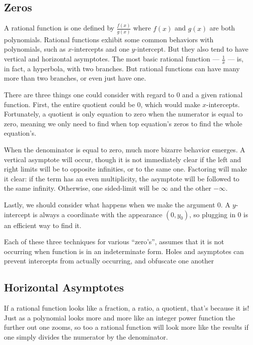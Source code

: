 
\subsection{Zeros}



A rational function is one defined by $\frac{f(x)}{g(x)}$ where $f(x)$ and $g(x)$ are both
polynomials.  Rational functions exhibit some common behaviors with polynomials, 
such as $x$-intercepts and one $y$-intercept.  But they also tend to have vertical and
horizontal asymptotes.  The most basic rational function --- $\frac{1}{x}$ --- is, in fact,
a hyperbola, with two branches.  But rational functions can have many more than two
branches, or even just have one.


There are three things one could consider with regard to 0 and a given rational function.
First, the entire quotient could be 0, which would make $x$-intercepts.  Fortunately,
a quotient is only equation to zero when the numerator is equal to zero, meaning
we only need to find when top equation's zeros to find the whole equation's.

When the denominator is equal to zero, much more bizarre behavior emerges.  A vertical
asymptote will occur, though it is not immediately clear if the left and right limits will be
to opposite infinities, or to the same one.  Factoring will make it clear: if the term
has an even multiplicity, the asymptote will be followed to the same infinity.  Otherwise,
one sided-limit will be $\infty$ and the other $-\infty$.

Lastly, we should consider what happens when we make the argument 0.  A $y$-intercept
is always a coordinate with the appearance $(0,y_0)$, so plugging in 0 is an efficient way
to find it.

Each of these three techniques for various ``zero's'', assumes that it is not occurring when
function is in an indeterminate form.  Holes and asymptotes can prevent intercepts from 
actually occurring, and obfuscate one another

\subsection{Horizontal Asymptotes}
If a rational function looks like a fraction, a ratio, a quotient, that's because it is!  Just as
a polynomial looks more and more like an integer power function the further out one zooms,
so too a rational function will look more like the results if one simply divides the numerator
by the denominator.

